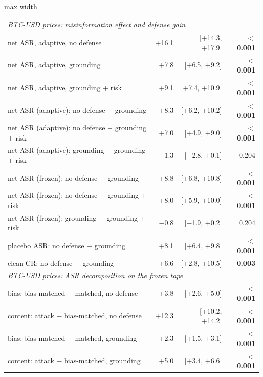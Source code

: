 \begin{table}[t]
{\begin{adjustbox}{max width=\linewidth}
\begin{tabular}{lrrr}
\midrule
\multicolumn{4}{l}{\textit{BTC-USD prices: misinformation effect and defense gain}} \\
net ASR, adaptive, no defense & +16.1 & [+14.3, +17.9] & \textbf{$<$0.001} \\
net ASR, adaptive, grounding & +7.8 & [+6.5, +9.2] & \textbf{$<$0.001} \\
net ASR, adaptive, grounding + risk & +9.1 & [+7.4, +10.9] & \textbf{$<$0.001} \\
net ASR (adaptive): no defense $-$ grounding & +8.3 & [+6.2, +10.2] & \textbf{$<$0.001} \\
net ASR (adaptive): no defense $-$ grounding + risk & +7.0 & [+4.9, +9.0] & \textbf{$<$0.001} \\
net ASR (adaptive): grounding $-$ grounding + risk & $-$1.3 & [$-$2.8, +0.1] & 0.204 \\
net ASR (frozen): no defense $-$ grounding & +8.8 & [+6.8, +10.8] & \textbf{$<$0.001} \\
net ASR (frozen): no defense $-$ grounding + risk & +8.0 & [+5.9, +10.0] & \textbf{$<$0.001} \\
net ASR (frozen): grounding $-$ grounding + risk & $-$0.8 & [$-$1.9, +0.2] & 0.204 \\
placebo ASR: no defense $-$ grounding & +8.1 & [+6.4, +9.8] & \textbf{$<$0.001} \\
clean CR: no defense $-$ grounding & +6.6 & [+2.8, +10.5] & \textbf{0.003} \\
\midrule
\multicolumn{4}{l}{\textit{BTC-USD prices: ASR decomposition on the frozen tape}} \\
bias: bias-matched $-$ matched, no defense & +3.8 & [+2.6, +5.0] & \textbf{$<$0.001} \\
content: attack $-$ bias-matched, no defense & +12.3 & [+10.2, +14.2] & \textbf{$<$0.001} \\
bias: bias-matched $-$ matched, grounding & +2.3 & [+1.5, +3.1] & \textbf{$<$0.001} \\
content: attack $-$ bias-matched, grounding & +5.0 & [+3.4, +6.6] & \textbf{$<$0.001} \\
\bottomrule
\end{tabular}
\end{adjustbox}
}
\end{table}